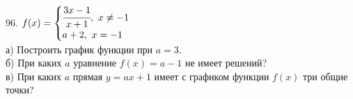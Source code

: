 96. $f(x)=\begin{cases} \cfrac{3x-1}{x+1},\ x\neq-1\\a+2,\ x=-1 \end{cases}$\\
а) Построить график функции при $a=3.$\\
б) При каких $a$ уравнение $f(x)=a-1$ не имеет решений?\\
в) При каких $a$ прямая $y=ax+1$ имеет с графиком функции $f(x)$ три общие точки?\\
